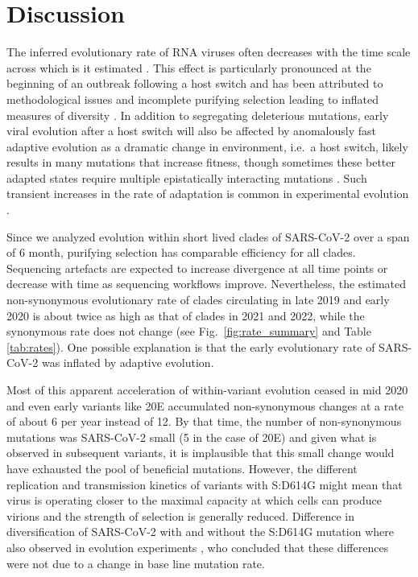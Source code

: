 \documentclass[aps,rmp, twocolumn]{revtex4}
\begin{document}
\section*{Discussion}
The inferred evolutionary rate of RNA viruses often decreases with the time scale across which is it estimated \citep{wertheim_purifying_2011,ghafari_prisoner_2021}.
This effect is particularly pronounced at the beginning of an outbreak following a host switch and has been attributed to methodological issues and incomplete purifying selection leading to inflated measures of diversity \citep{meyer_time_2015,ghafari_purifying_2022}.
In addition to segregating deleterious mutations, early viral evolution after a host switch will also be affected by anomalously fast adaptive evolution as a dramatic change in environment, i.e.~a host switch, likely results in many mutations that increase fitness, though sometimes these better adapted states require multiple epistatically interacting mutations \citep{martin_emergence_2021}.
Such transient increases in the rate of adaptation is common in experimental evolution \citep{elena_virus_2007}.

Since we analyzed evolution within short lived clades of SARS-CoV-2 over a span of 6 month, purifying selection has comparable efficiency for all clades.
Sequencing artefacts are expected to increase divergence at all time points or decrease with time as sequencing workflows improve.
Nevertheless, the estimated non-synonymous evolutionary rate of clades circulating in late 2019 and early 2020 is about twice as high as that of clades in 2021 and 2022, while the synonymous rate does not change (see Fig.~\ref{fig:rate_summary} and Table \ref{tab:rates}).
One possible explanation is that the early evolutionary rate of SARS-CoV-2 was inflated by adaptive evolution.

Most of this apparent acceleration of within-variant evolution ceased in mid 2020 and even early variants like 20E accumulated non-synonymous changes at a rate of about 6 per year instead of 12.
By that time, the number of non-synonymous mutations was SARS-CoV-2 small (5 in the case of 20E) and given what is observed in subsequent variants, it is implausible that this small change would have exhausted the pool of beneficial mutations.
However, the different replication and transmission kinetics of variants with S:D614G might mean that virus is operating closer to the maximal capacity at which cells can produce virions and the strength of selection is generally reduced.
Difference in diversification of SARS-CoV-2 with and without the S:D614G mutation where also observed in evolution experiments \citep{amicone_mutation_2022}, who concluded that these differences were not due to a change in base line mutation rate.
\end{document}

